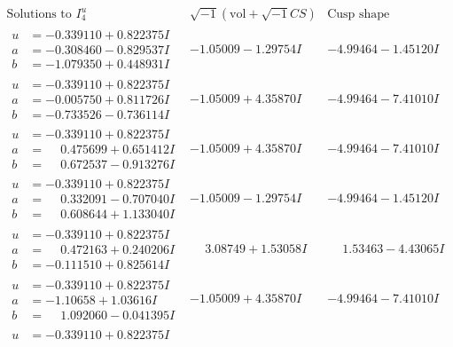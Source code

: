 \documentclass[1p]{elsarticle_modified}
\theoremstyle{definition}
\newcommand{\I}{\sqrt{-1}}
\begin{document}
$$\begin{array}{c|c|c}  
\text{Solutions to }I^u_{4}& \I (\text{vol} + \sqrt{-1}CS) & \text{Cusp shape}\\
 \hline 
\begin{aligned}
u &= -0.339110 + 0.822375 I \\
a &= -0.308460 - 0.829537 I \\
b &= -1.079350 + 0.448931 I\end{aligned}
 & -1.05009 - 1.29754 I & -4.99464 - 1.45120 I \\ \hline\begin{aligned}
u &= -0.339110 + 0.822375 I \\
a &= -0.005750 + 0.811726 I \\
b &= -0.733526 - 0.736114 I\end{aligned}
 & -1.05009 + 4.35870 I & -4.99464 - 7.41010 I \\ \hline\begin{aligned}
u &= -0.339110 + 0.822375 I \\
a &= \phantom{-}0.475699 + 0.651412 I \\
b &= \phantom{-}0.672537 - 0.913276 I\end{aligned}
 & -1.05009 + 4.35870 I & -4.99464 - 7.41010 I \\ \hline\begin{aligned}
u &= -0.339110 + 0.822375 I \\
a &= \phantom{-}0.332091 - 0.707040 I \\
b &= \phantom{-}0.608644 + 1.133040 I\end{aligned}
 & -1.05009 - 1.29754 I & -4.99464 - 1.45120 I \\ \hline\begin{aligned}
u &= -0.339110 + 0.822375 I \\
a &= \phantom{-}0.472163 + 0.240206 I \\
b &= -0.111510 + 0.825614 I\end{aligned}
 & \phantom{-}3.08749 + 1.53058 I & \phantom{-}1.53463 - 4.43065 I \\ \hline\begin{aligned}
u &= -0.339110 + 0.822375 I \\
a &= -1.10658 + 1.03616 I \\
b &= \phantom{-}1.092060 - 0.041395 I\end{aligned}
 & -1.05009 + 4.35870 I & -4.99464 - 7.41010 I \\ \hline\begin{aligned}
u &= -0.339110 + 0.822375 I \\

\end{aligned}
\end{array}$$
\end{document}
